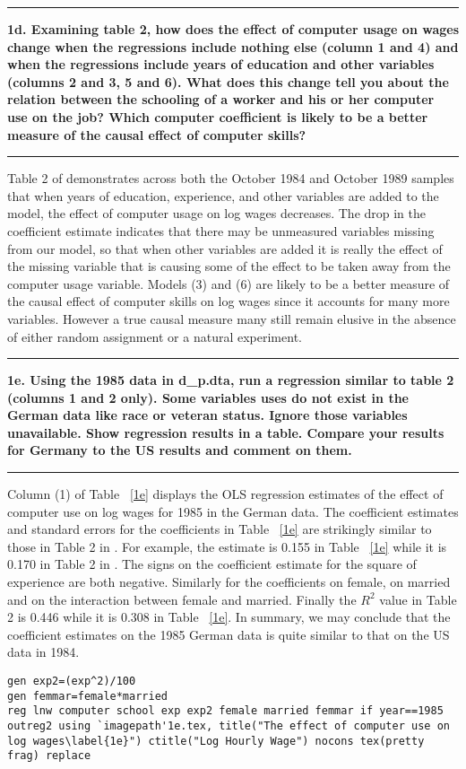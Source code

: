 \documentclass[12pt]{article}
\newcommand\question[1]{\vspace{1em}\hrule\vspace{1em}\textbf{#1}\vspace{1em}\hrule\vspace{1em}}
\begin{document}
\question{1d. Examining \cite{Krueger1993} table 2, how does the effect of computer usage on wages change when the regressions include nothing else (column 1 and 4) and when the regressions include years of education and other variables (columns 2 and 3, 5 and 6). What does this change tell you about the relation between the schooling of a worker and his or her computer use on the job? Which computer coefficient is likely to be a better measure of the causal effect of computer skills?}
Table 2 of \cite{Krueger1993} demonstrates across both the October 1984 and October 1989 samples that when years of education, experience, and other variables are added to the model, the effect of computer usage on log wages decreases. The drop in the coefficient estimate indicates that there may be unmeasured variables missing from our model, so that when other variables are added it is really the effect of the missing variable that is causing some of the effect to be taken away from the computer usage variable. Models (3) and (6) are likely to be a better measure of the causal effect of computer skills on log wages since it accounts for many more variables. However a true causal measure many still remain elusive in the absence of either random assignment or a natural experiment.
\newpage
\question{1e. Using the 1985 data in d\_p.dta, run a regression similar to \cite{Krueger1993} table 2 (columns 1 and 2 only). Some variables \cite{Krueger1993} uses do not exist in the German data like race or veteran status. Ignore those variables unavailable. Show regression results in a table. Compare your results for Germany to the US results and comment on them.}
Column (1) of Table ~\ref{1e} displays the OLS regression estimates of the effect of computer use on log wages for 1985 in the German data. The coefficient estimates and standard errors for the coefficients in Table ~\ref{1e} are strikingly similar to those in Table 2 in \cite{Krueger1993}. For example, the estimate is 0.155 in Table ~\ref{1e} while it is 0.170 in Table 2 in \cite{Krueger1993}. The signs on the coefficient estimate for the square of experience are both negative. Similarly for the coefficients on female, on married and on the interaction between female and married. Finally the $R^2$ value in \cite{Krueger1993} Table 2 is 0.446 while it is 0.308 in Table ~\ref{1e}. In summary, we may conclude that the coefficient estimates on the 1985 German data is quite similar to that on the US data in 1984.

\begin{lstlisting}
gen exp2=(exp^2)/100
gen femmar=female*married
reg lnw computer school exp exp2 female married femmar if year==1985
outreg2 using `imagepath'1e.tex, title("The effect of computer use on log wages\label{1e}") ctitle("Log Hourly Wage") nocons tex(pretty frag) replace
\end{lstlisting}
\end{document}
